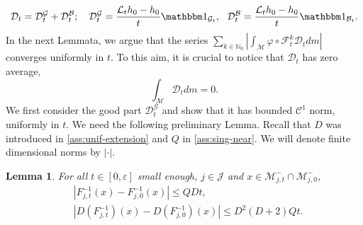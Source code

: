 \documentclass{amsart}
\numberwithin{equation}{section}
\newtheorem{lemma}[theorem]{Lemma}
\newcommand\ve{\varepsilon}
\newcommand\vf{\varphi}
\renewcommand{\le}{\leqslant}
\newcommand\cB{{\mathcal B}}
\newcommand\cC{{\mathcal C}}
\newcommand\cF{{\mathcal F}}
\newcommand\cG{{\mathcal G}}
\newcommand\cJ{{\mathcal J}}
\newcommand\cL{{\mathcal L}}
\newcommand\cM{{\mathcal M}}
\newcommand\bN{{\mathbb N}}
\newcommand{\Deriv}{\mathcal D}
\begin{document}
\begin{equation}\label{eq:deriv-def}
\Deriv_t = \Deriv_t^\cG + \Deriv_t^\cB; \quad   \Deriv_t^\cG = \frac{\cL_{t} h_0 - h_0}{t}\mathbbm 1_{\cG_t}, \text{ }\text{ } \Deriv_t^\cB = \frac{\cL_{t} h_0 - h_0}{t}\mathbbm 1_{\cB_t}.
\end{equation}
In the next Lemmata, we argue that the series \(\sum_{k \in \bN_0} \left|\int_{\cM} \vf \circ \cF_t^k \Deriv_t dm \right|\) converges uniformly in \(t\). To this aim, it is crucial to notice that \(\Deriv_t\) has zero average,
\begin{equation}\label{eq:zero-avg-D}
  \int_{\cM} \Deriv_t dm = 0.
\end{equation} 
We first consider the good part \(\Deriv_t^{\cG}\) and show that it has bounded \(\cC^1\) norm, uniformly in \(t\). We need the following preliminary Lemma. Recall that \(D\) was introduced in \ref{ass:unif-extension} and \(Q\) in \ref{ass:sing-near}. We will denote finite dimensional norms by \(|\cdot|\).
\begin{lemma}
\label{lem:bounding-inverse}
For all \(t \in [0,\ve]\) small enough, \(j \in \cJ\) and \(x \in \cM_{j,t}^{-} \cap \cM_{j,0}^{-}\),
\[
\begin{split}
  &\left|F_{j,t}^{-1}(x) - F_{j,0}^{-1}(x) \right| \le QD t,\\
  & \left| D(F_{j,t}^{-1})(x) - D(F_{j,0}^{-1})(x)\right| \le D^2(D+2)Qt.
\end{split}
\]
\end{lemma}
\end{document}
